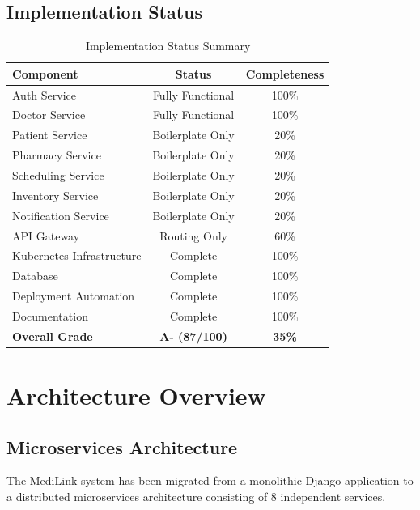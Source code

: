 \documentclass[12pt,a4paper]{article}
\begin{document}
\subsection{Implementation Status}
\begin{table}[h]
\centering
\begin{tabular}{@{}lcc@{}}
\toprule
\textbf{Component} & \textbf{Status} & \textbf{Completeness} \\
\midrule
Auth Service & Fully Functional & 100\% \\
Doctor Service & Fully Functional & 100\% \\
Patient Service & Boilerplate Only & 20\% \\
Pharmacy Service & Boilerplate Only & 20\% \\
Scheduling Service & Boilerplate Only & 20\% \\
Inventory Service & Boilerplate Only & 20\% \\
Notification Service & Boilerplate Only & 20\% \\
API Gateway & Routing Only & 60\% \\
Kubernetes Infrastructure & Complete & 100\% \\
Database & Complete & 100\% \\
Deployment Automation & Complete & 100\% \\
Documentation & Complete & 100\% \\
\midrule
\textbf{Overall Grade} & \textbf{A- (87/100)} & \textbf{35\%} \\
\bottomrule
\end{tabular}
\caption{Implementation Status Summary}
\end{table}

\section{Architecture Overview}

\subsection{Microservices Architecture}
The MediLink system has been migrated from a monolithic Django application to a distributed microservices architecture consisting of 8 independent services.
\end{document}
